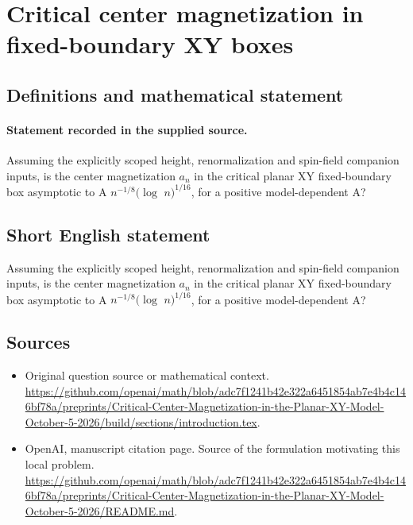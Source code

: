 \documentclass[11pt]{article}
\begin{document}
\section*{Critical center magnetization in fixed-boundary XY boxes}\label{30007414}
\subsection{Definitions and mathematical statement}
\paragraph{Statement recorded in the supplied source.}
Assuming the explicitly scoped height, renormalization and spin-field companion inputs, is the center magnetization $a_n$ in the critical planar XY fixed-boundary box asymptotic to A $n^{-1/8}(\log $ $n)^{1/16}$, for a positive model-dependent A?
\subsection{Short English statement}
Assuming the explicitly scoped height, renormalization and spin-field companion inputs, is the center magnetization $a_n$ in the critical planar XY fixed-boundary box asymptotic to A $n^{-1/8}(\log $ $n)^{1/16}$, for a positive model-dependent A?
\subsection{Sources}
\begin{itemize}
\item[S1] Original question source or mathematical context.
\url{https://github.com/openai/math/blob/adc7f1241b42e322a6451854ab7e4b4c146bf78a/preprints/Critical-Center-Magnetization-in-the-Planar-XY-Model-October-5-2026/build/sections/introduction.tex}.
\item[S2] OpenAI, manuscript citation page. Source of the formulation motivating this local problem.
\url{https://github.com/openai/math/blob/adc7f1241b42e322a6451854ab7e4b4c146bf78a/preprints/Critical-Center-Magnetization-in-the-Planar-XY-Model-October-5-2026/README.md}.
\end{itemize}
\end{document}
